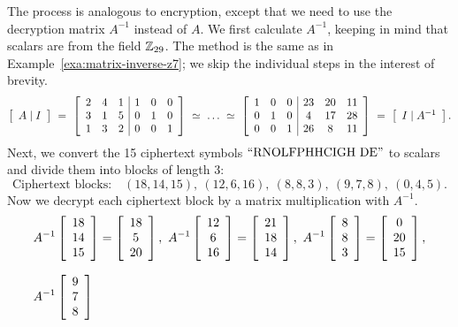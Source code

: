 \documentclass{ximera}
\begin{document}
\begin{solution}
  The process is analogous to encryption, except that we need to use
  the decryption matrix $A^{-1}$ instead of $A$. We first calculate
  $A^{-1}$, keeping in mind that scalars are from the field $\Z_{29}$.
  The method is the same as in Example~\ref{exa:matrix-inverse-z7}; we
  skip the individual steps in the interest of brevity.
  \begin{equation*}
    \startmat{c}A\mid I\stopmat
    ~=~
    \startmat{ccc|ccc}
      2 & 4 & 1  &  1 & 0 & 0 \\
      3 & 1 & 5  &  0 & 1 & 0 \\
      1 & 3 & 2  &  0 & 0 & 1 \\
    \stopmat
    ~\simeq~\ldots~\simeq~
    \startmat{ccc|ccc}
      1 & 0 & 0  &  23 & 20 & 11 \\
      0 & 1 & 0  &   4 & 17 & 28 \\
      0 & 0 & 1  &  26 &  8 & 11 \\
    \stopmat
    ~=~
    \startmat{c}I\mid A^{-1}\stopmat.
  \end{equation*}
  Next, we convert the 15 ciphertext symbols $\q{RNOLFPHHCIGH DE}$ to
  scalars and divide them into blocks of length 3:
  \begin{equation*}
    \mbox{Ciphertext blocks:}\quad
    (18,14,15),\
    (12,6,16),\
    (8,8,3),\
    (9,7,8),\
    (0,4,5).
  \end{equation*}
  Now we decrypt each ciphertext block by a matrix multiplication
  with $A^{-1}$.
  \begin{align*}
    &A^{-1} \startmat{c} 18 \\ 14 \\ 15 \stopmat
    = \startmat{c} 18 \\ 5 \\ 20 \stopmat,
    \quad
    A^{-1} \startmat{c} 12 \\ 6 \\ 16 \stopmat
    = \startmat{c} 21 \\ 18 \\ 14 \stopmat,
    \quad
    A^{-1} \startmat{c} 8 \\ 8 \\ 3 \stopmat
    = \startmat{c} 0 \\ 20 \\ 15 \stopmat,
    \\\\[-2ex]
    &A^{-1} \startmat{c} 9 \\ 7 \\ 8 \stopmat

\end{align*}
\end{solution}
\end{document}
